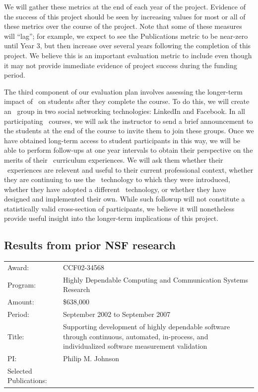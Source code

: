 We will gather these metrics at the end of each year of the project.
Evidence of the success of this project should be seen by increasing values
for most or all of these metrics over the course of the project.  Note that
some of these measures will ``lag''; for example, we expect to see the
Publications metric to be near-zero until Year 3, but then increase over
several years following the completion of this project. We believe this is
an important evaluation metric to include even though it may not provide
immediate evidence of project success during the funding period.

The third component of our evaluation plan involves assessing the
longer-term impact of \eCT\ on students after they complete the course. To
do this, we will create an \eCT\ group in two social networking
technologies: LinkedIn and Facebook.  In all participating \eCT\ courses,
we will ask the instructor to send a brief announcement to the students at
the end of the course to invite them to join these groups.  Once we have
obtained long-term access to student participants in this way, we will be
able to perform follow-ups at one year intervals to obtain their
perspective on the merits of their \eCT\ curriculum experiences. We will
ask them whether their \eCT\ experiences are relevent and useful to their
current professional context, whether they are continuing to use the \eCT\
technology to which they were introduced, whether they have adopted a
different \eCT\ technology, or whether they have designed and implemented
their own.  While such followup will not constitute a statistically valid
cross-section of participants, we believe it will nonetheless provide
useful insight into the longer-term implications of this project. 

\subsection{Results from prior NSF research}

\begin{tabular}{p{1in}p{5in}}

Award: & CCF02-34568 \\ 
Program: & Highly Dependable Computing and Communication Systems Research\\ 
Amount: & \$638,000 \\ 
Period: & September 2002 to September 2007 \\ 
Title: & Supporting development of highly dependable software through
continuous, automated, in-process, and individualized software measurement validation \\ 
PI: & Philip M. Johnson \\ 
Selected \newline Publications: & \cite{csdl2-04-22,csdl2-04-13,csdl2-04-11,csdl2-03-12,
csdl2-02-07,csdl2-03-07,csdl2-04-02,csdl2-04-04,csdl2-04-11,csdl2-06-07,csdl2-06-08,csdl2-06-13,csdl2-06-06}
\end{tabular} \\ %

